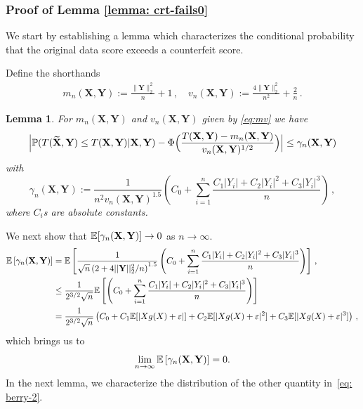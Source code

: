 \documentclass[11pt]{article}
\newtheorem{lemma}[propo]{Lemma}
\def\bX{\mathbf{X}}
\def\bY{\mathbf{Y}}
\def\tbX{\widetilde{\bX}}
\begin{document}
\subsubsection{Proof of Lemma \ref{lemma: crt-fails0}}
We start by establishing a lemma which characterizes the conditional probability that the original data score exceeds a counterfeit score.

Define the shorthands
\begin{align}\label{eq:mv}
m_n(\bX,\bY):=\frac{\|\bY\|_2^2}{n}+1\,,\quad
v_n(\bX,\bY):=\frac{4 \|\bY\|_2^2}{n^2}+\frac{2}{n}\,.
\end{align}
%
\begin{lemma}\label{lemma:indicators-cond-exp} 
 For $m_n(\bX,\bY)$ and $v_n(\bX,\bY)$ given by \eqref{eq:mv} we have
 \begin{equation}\label{eq: berry-2}
\Big|\prob( T(\tbX,\bY) \leq T(\bX,\bY)  | \bX,\bY ) -  \Phi\Big( \frac{T(\bX,\bY)-m_n(\bX,\bY)}{v_n(\bX,\bY)^{1/2}} \Big) \Big| \leq   \gamma_n(\bX,\bY)
\end{equation}
with 
\[
 \gamma_n(\bX,\bY) :=  \frac{1}{n^2 v_n(\bX,\bY)^{1.5}   } \left( C_0+\sum\limits_{i=1}^{n}\frac{C_1|Y_i|+C_2|Y_i|^2+C_3|Y_i|^3}{n} \right)\,,
\]
where $C_i$s are absolute constants.
\end{lemma}
We next show that $\E[\gamma_n(\bX,\bY)] \to 0$ as $n\to\infty$.
\begin{align*}
\E\left[\gamma_n(\bX,\bY)\right] &=  \E\left[\frac{1}{\sqrt{n}\left(2+4||\bY||_2^2/n\right)^{1.5}   } \left( C_0+\sum\limits_{i=1}^{n}\frac{C_1|Y_i|+C_2|Y_i|^2+C_3|Y_i|^3}{n} \right) \right] \,,\\
& \leq \frac{1}{2^{3/2}\sqrt{n}} \E\left[ \left( C_0+\sum\limits_{i=1}^{n}\frac{C_1|Y_i|+C_2|Y_i|^2+C_3|Y_i|^3}{n} \right) \right] \\
&= \frac{1}{2^{3/2}\sqrt{n}} \left( C_0+ C_1\E[|Xg(X)+\eps|] +C_2\E[|Xg(X)+\eps|^2]+C_3\E[|Xg(X)+\eps|^3] \right) \,,
\end{align*}
which brings us to 
\begin{align}\label{eq:Ezero}
\lim\limits_{n\rightarrow \infty}^{} \E\left[\gamma_n(\bX,\bY)\right] =0.
\end{align}
In the next lemma, we characterize the distribution of the other quantity in~\eqref{eq: berry-2}.  
\end{document}
